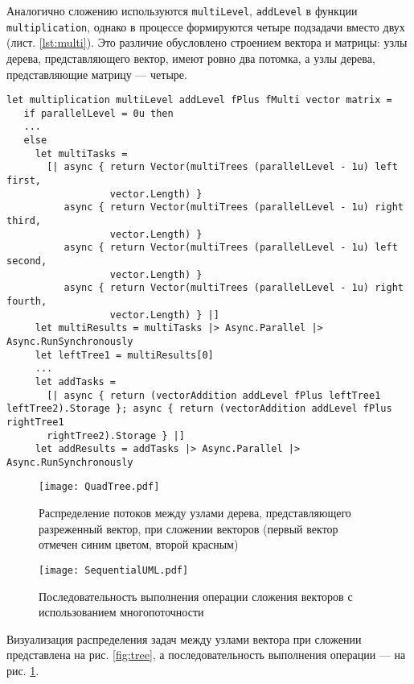 Аналогично сложению используются \texttt{multiLevel}, \texttt{addLevel} в функции \texttt{multi\-plication}, однако в процессе формируются четыре подзадачи вместо двух (лист. \ref{lst:multi}). Это различие обусловлено строением вектора и матрицы: узлы дерева, представляющего вектор, имеют ровно два потомка, а узлы дерева, представляющие матрицу --- четыре. 



\begin{lstlisting}[style=fsharp, caption={Фрагмент функции умножения вектора и матрицы, отвечающий за параллельную составляющую операции}, label={lst:multi},  frame=single]
let multiplication multiLevel addLevel fPlus fMulti vector matrix =
   if parallelLevel = 0u then
   ...
   else
     let multiTasks =
       [| async { return Vector(multiTrees (parallelLevel - 1u) left first,
                  vector.Length) }
          async { return Vector(multiTrees (parallelLevel - 1u) right third,
                  vector.Length) }
          async { return Vector(multiTrees (parallelLevel - 1u) left second,
                  vector.Length) }
          async { return Vector(multiTrees (parallelLevel - 1u) right fourth,
                  vector.Length) } |]
     let multiResults = multiTasks |> Async.Parallel |> Async.RunSynchronously
     let leftTree1 = multiResults[0]
     ...
     let addTasks =
       [| async { return (vectorAddition addLevel fPlus leftTree1 leftTree2).Storage }; async { return (vectorAddition addLevel fPlus rightTree1
       rightTree2).Storage } |]
     let addResults = addTasks |> Async.Parallel |> Async.RunSynchronously

\end{lstlisting}

\begin{figure}
    \centering
    \texttt{[image: QuadTree.pdf]}
    \caption{Распределение потоков между узлами дерева, представляющего разреженный вектор, при сложении векторов (первый вектор отмечен синим цветом, второй красным)\\}
    \label{fig:tree}
    \texttt{[image: SequentialUML.pdf]}
    \caption{Последовательность выполнения операции сложения векторов с использованием многопоточности}
    \label{fig:uml}
\end{figure}

Визуализация распределения задач между узлами вектора при сложении представлена на рис. \ref{fig:tree}, а последовательность выполнения операции --- на рис. \ref{fig:uml}.

